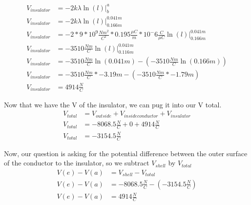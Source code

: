 \documentclass{article}
\begin{document}
\begin{align*}
	V_{insulator} &= -2k\lambda\ln(l)\bigg|^a_{b}\\
	V_{insulator} &= -2k\lambda\ln(l)\bigg|^{0.041m}_{0.166m}\\
	V_{insulator}&= -2 * 9 * 10^9 \frac{Nm^2}{C^2} * 0.195 \frac{\mu C}{m} * 10^-6 \frac{C}{\mu C} \ln(l)\bigg|^{0.041m}_{0.166m}\\
	V_{insulator} &= -3510 \frac{Nm}{C} \ln(l)\bigg|^{0.041m}_{0.116m}\\
	V_{insulator} &= -3510 \frac{Nm}{C}\ln(0.041m) -  (-3510 \frac{Nm}{C}\ln(0.166m)) \\
	V_{insulator} &= -3510 \frac{Nm}{C}* -3.19m - ( -3510 \frac{Nm}{C}* -1.79m)\\
	V_{insulator} &= 4914 \frac{N}{C}
\end{align*}

Now that we have the V of the insulator, we can pug it into our V total.
\begin{align*}
	V_{total} &= V_{outside} + V_{inside conductor} + V_{insulator}\\
	V_{total} &= -8068.5 \frac{N}{C} + 0 + 4914 \frac{N}{C}\\
	V_{total} &= -3154.5 \frac{N}{C}
\end{align*}

Now, our question is asking for the potential difference between the outer surface of the conductor to the insulator, so we subtract $V_{shell}$ by $V_{total} $
\begin{align*}
	V(e) - V(a) &= V_{shell} - V_{total}\\
	V(e) - V(a) &= -8068.5 \frac{N}{C} - (-3154.5 \frac{N}{C})\\
	V(e) - V(a) &= 4914 \frac{N}{C}
\end{align*}
\end{document}
